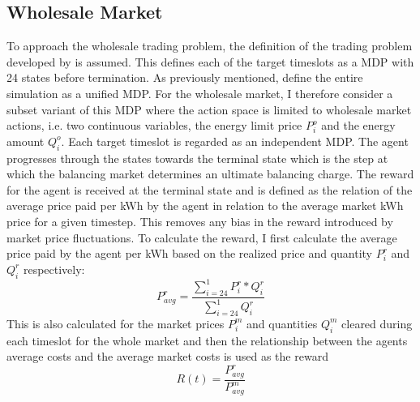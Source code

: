 
\subsection{Wholesale Market}
\label{sub:wholesale_market}

To approach the wholesale trading problem, the definition of the trading problem developed by
\citet{tactexurieli2016mdp} is assumed. This defines each of the target timeslots as a \ac{MDP} with 24 states before
termination. As previously mentioned, \citet{tactexurieli2016mdp} define the entire simulation as a unified \ac{MDP}.
For the wholesale market, I therefore consider a subset variant of this \ac{MDP} where the action space is limited to
wholesale market actions, i.e.
two continuous variables, the energy limit price $P^o_i$ and the energy amount $Q^o_i$. Each target timeslot is regarded as
an independent \ac{MDP}. The agent progresses through the states towards the terminal state which is the step at which
the balancing market determines an ultimate balancing charge. The reward for the agent is received at the terminal state
and is defined as the relation of the average price paid per \ac{kWh} by the agent in relation to the average market
\ac{kWh}
price for a given timestep. This removes any bias in the reward introduced by market price fluctuations. To calculate
the reward, I first calculate the average price paid by the agent per \ac{kWh} based on the realized price and quantity
$P^r_i$ and $Q^r_i$ respectively:
\begin{equation}
    \label{eq:Average price per kWh for a given target timeslot}
    P^{r}_{avg} =\frac{\sum ^{1}_{i=24} P^{r}_{i} *Q^{r}_{i}}{\sum ^{1}_{i=24} Q^{r}_{i}}


\end{equation}
This is also calculated for the market prices $P^m_{i}$ and quantities $Q^m_i$ cleared during each timeslot for the whole market and then the
relationship between the agents average costs and the average market costs is used as the reward
\begin{equation}
    R(t) = \frac{P^r_{avg}}{P^m_{avg}}
\end{equation}


